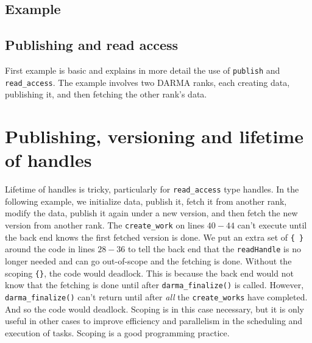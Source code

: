 \subsection{Example}




\subsection{Publishing and read access}

First example is basic and explains in more detail the use of \texttt{publish} 
and \texttt{read\_access}. The example involves two DARMA ranks, each creating 
data, publishing it, and then fetching the other rank's data.







\section{Publishing, versioning and lifetime of handles}

Lifetime of handles is tricky, particularly for \texttt{read\_access} type handles.  
In the following example, we initialize data, publish it, fetch it from another rank, 
modify the data, publish it again under a new version, and then fetch the new version from another rank. 
The \texttt{create\_work} on lines $40-44$ can't execute until the back end knows the first fetched version is done.
We put an extra set of \texttt{\{ \}} around the code in lines $28-36$ to tell the back end that 
the \texttt{readHandle} is no longer needed and can go out-of-scope and the fetching is done.  
Without the scoping \texttt{\{\}}, the code would deadlock. This is because the back end would not know that 
the fetching is done until after \texttt{darma\_finalize()} is called. However, \texttt{darma\_finalize()} 
can't return until after {\it all} the \texttt{create\_works} have completed.  And so the code would deadlock. 
Scoping is in this case necessary, but it is only useful in other cases to improve efficiency and parallelism 
in the scheduling and execution of tasks. Scoping is a good programming practice.










